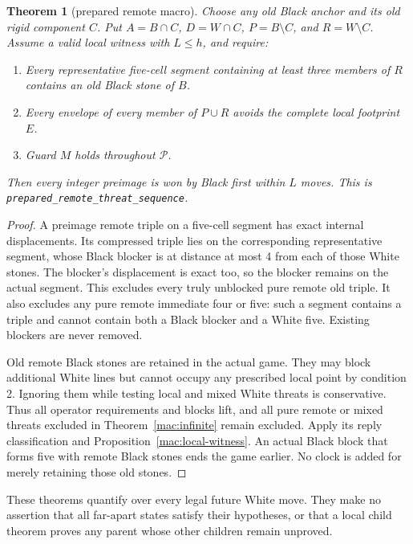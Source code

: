 \documentclass[11pt]{article}
\newtheorem{theorem}{Theorem}[section]
\theoremstyle{definition}
\theoremstyle{remark}
\begin{document}
\begin{theorem}[prepared remote macro]\label{mac:prepared}
Choose any old Black anchor and its old rigid component \(C\). Put \(A=B\cap C\), \(D=W\cap C\), \(P=B\setminus C\), and \(R=W\setminus C\). Assume a valid local witness with \(L\le h\), and require:

\begin{enumerate}
\item Every representative five-cell segment containing at least three members of \(R\) contains an old Black stone of \(B\).
\item Every envelope of every member of \(P\cup R\) avoids the complete local footprint \(E\).
\item Guard \(M\) holds throughout \(\mathcal P\).

\end{enumerate}
Then every integer preimage is won by Black first within \(L\) moves. This is \texttt{prepared\_\allowbreak remote\_\allowbreak threat\_\allowbreak sequence}.

\end{theorem}
\begin{proof}
A preimage remote triple on a five-cell segment has exact internal displacements. Its compressed triple lies on the corresponding representative segment, whose Black blocker is at distance at most 4 from each of those White stones. The blocker's displacement is exact too, so the blocker remains on the actual segment. This excludes every truly unblocked pure remote old triple. It also excludes any pure remote immediate four or five: such a segment contains a triple and cannot contain both a Black blocker and a White five. Existing blockers are never removed.

Old remote Black stones are retained in the actual game. They may block additional White lines but cannot occupy any prescribed local point by condition 2. Ignoring them while testing local and mixed White threats is conservative. Thus all operator requirements and blocks lift, and all pure remote or mixed threats excluded in Theorem~\ref{mac:infinite} remain excluded. Apply its reply classification and Proposition~\ref{mac:local-witness}. An actual Black block that forms five with remote Black stones ends the game earlier. No clock is added for merely retaining those old stones. 
\end{proof}

These theorems quantify over every legal future White move. They make no assertion that all far-apart states satisfy their hypotheses, or that a local child theorem proves any parent whose other children remain unproved.
\end{document}
